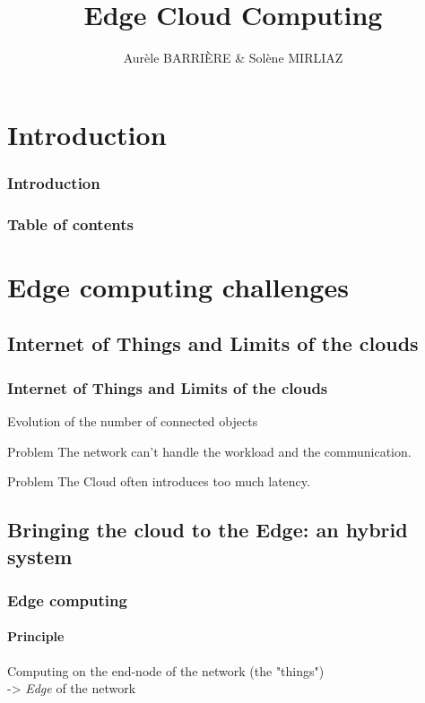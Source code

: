 \documentclass[utf8,xcolor=table, page number]{earlywinter}
\begin{document}
\title{Edge Cloud Computing}
\author{Aurèle BARRIÈRE & Solène MIRLIAZ}

\begin{frame}[plain]
  \titlepage%
\end{frame}

\section{Introduction}
\begin{frame}
	\frametitle{Introduction}

\end{frame}

  \begin{frame}
    \frametitle{Table of contents}
    \tableofcontents[]
  \end{frame}
  
  
\section{Edge computing challenges}
\subsection{Internet of Things and Limits of the clouds}
\begin{frame}
  \frametitle{Internet of Things and Limits of the clouds}
  Evolution of the number of connected objects
  
	\begin{alertblock}{Problem}
			The network can't handle the workload and the communication.
	\end{alertblock}
        \begin{alertblock}{Problem}
			The Cloud often introduces too much latency.
	\end{alertblock}

\end{frame}

\subsection{Bringing the cloud to the Edge: an hybrid system} %
\begin{frame}
  \frametitle{Edge computing}
  \framesubtitle{Principle}
  Computing on the end-node of the network (the "things")\\
  -> \emph{Edge} of the network
\end{frame}
\end{document}
